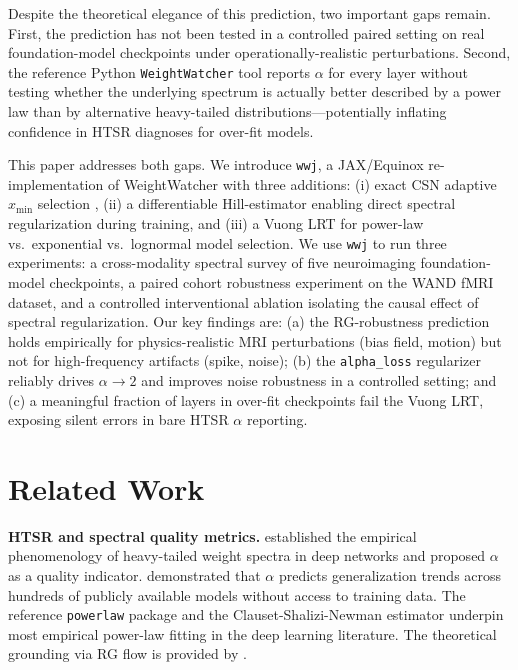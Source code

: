 \documentclass{article} %
\theoremstyle{plain}
\theoremstyle{definition}
\theoremstyle{remark}
\begin{document}
Despite the theoretical elegance of this prediction, two important gaps remain. First, the prediction has not been tested in a controlled paired setting on real foundation-model checkpoints under operationally-realistic perturbations. Second, the reference Python \texttt{WeightWatcher} tool reports $\alpha$ for every layer without testing whether the underlying spectrum is actually better described by a power law than by alternative heavy-tailed distributions---potentially inflating confidence in HTSR diagnoses for over-fit models.

This paper addresses both gaps. We introduce \texttt{wwj}, a JAX/Equinox \citep{jax2018,kidger2021equinox} re-implementation of WeightWatcher with three additions: (i) exact CSN adaptive $x_{\min}$ selection \citep{clauset2009powerlaw}, (ii) a differentiable Hill-estimator enabling direct spectral regularization during training, and (iii) a Vuong LRT \citep{vuong1989likelihood} for power-law vs.\ exponential vs.\ lognormal model selection. We use \texttt{wwj} to run three experiments: a cross-modality spectral survey of five neuroimaging foundation-model checkpoints, a paired cohort robustness experiment on the WAND fMRI dataset, and a controlled interventional ablation isolating the causal effect of spectral regularization. Our key findings are: (a) the RG-robustness prediction holds empirically for physics-realistic MRI perturbations (bias field, motion) but not for high-frequency artifacts (spike, noise); (b) the \texttt{alpha\_loss} regularizer reliably drives $\alpha \to 2$ and improves noise robustness in a controlled setting; and (c) a meaningful fraction of layers in over-fit checkpoints fail the Vuong LRT, exposing silent errors in bare HTSR $\alpha$ reporting.

\section{Related Work}
\label{sec:related}

\textbf{HTSR and spectral quality metrics.} \citet{martin2021implicit} established the empirical phenomenology of heavy-tailed weight spectra in deep networks and proposed $\alpha$ as a quality indicator. \citet{martin2021predicting} demonstrated that $\alpha$ predicts generalization trends across hundreds of publicly available models without access to training data. The reference \texttt{powerlaw} package \citep{alstott2014powerlaw} and the Clauset-Shalizi-Newman estimator \citep{clauset2009powerlaw} underpin most empirical power-law fitting in the deep learning literature. The theoretical grounding via RG flow is provided by \citet{martin2026rg}.
\end{document}
